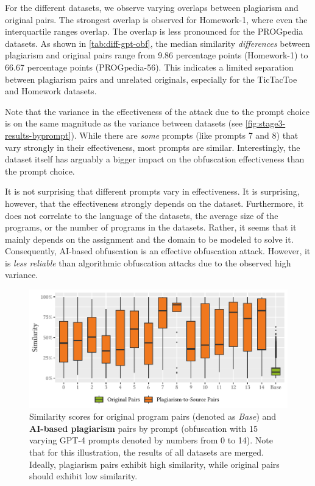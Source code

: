 For the different datasets, we observe varying overlaps between plagiarism and original pairs. The strongest overlap is observed for Homework-1, where even the interquartile ranges overlap. The overlap is less pronounced for the PROGpedia datasets.
As shown in \autoref{tab:diff-gpt-obf}, the median similarity \textit{differences} between plagiarism and original pairs range from 9.86 percentage points (Homework-1) to 66.67 percentage points (PROGpedia-56). 
This indicates a limited separation between plagiarism pairs and unrelated originals, especially for the TicTacToe and Homework datasets. 

Note that the variance in the effectiveness of the attack due to the prompt choice is on the same magnitude as the variance between datasets (see \autoref{fig:stage3-results-byprompt}). 
While there are \textit{some} prompts (like prompts 7 and 8) that vary strongly in their effectiveness, most prompts are similar. Interestingly, the dataset itself has arguably a bigger impact on the obfuscation effectiveness than the prompt choice.

It is not surprising that different prompts vary in effectiveness. It is surprising, however, that the effectiveness strongly depends on the dataset. Furthermore, it does not correlate to the language of the datasets, the average size of the programs, or the number of programs in the datasets.
Rather, it seems that it mainly depends on the assignment and the domain to be modeled to solve it.
Consequently, AI-based obfuscation is an effective obfuscation attack. However, it is \textit{less reliable} than algorithmic obfuscation attacks due to the observed high variance.

\begin{figure}
\centering
\includegraphics[width=\linewidth]{figures/disseval/eval-chatgpt-obf_avg.similarity-byprompt.pdf}
\caption[Evaluation Results: AI-based Obfuscation by Prompt]{Similarity scores for original program pairs (denoted as \textit{Base}) and \textbf{AI-based plagiarism} pairs by prompt (obfuscation with 15 varying GPT-4 prompts denoted by numbers from 0 to 14). Note that for this illustration, the results of all datasets are merged. Ideally, plagiarism pairs exhibit high similarity, while original pairs should exhibit low similarity.}
\label{fig:stage3-results-byprompt}
\end{figure}


